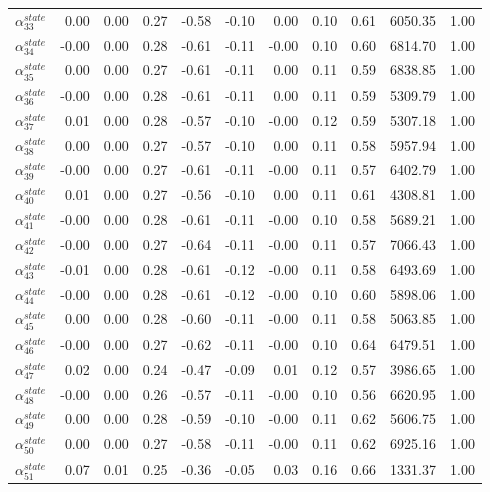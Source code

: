 \documentclass[12pt,english,a4paper]{article}
\begin{document}
\begin{table}[ht]
\begin{tabular}{rrrrrrrrrrr}
  $\alpha_{33}^{state}$ & 0.00 & 0.00 & 0.27 & -0.58 & -0.10 & 0.00 & 0.10 & 0.61 & 6050.35 & 1.00 \\ 
  $\alpha_{34}^{state}$ & -0.00 & 0.00 & 0.28 & -0.61 & -0.11 & -0.00 & 0.10 & 0.60 & 6814.70 & 1.00 \\ 
  $\alpha_{35}^{state}$ & 0.00 & 0.00 & 0.27 & -0.61 & -0.11 & 0.00 & 0.11 & 0.59 & 6838.85 & 1.00 \\ 
  $\alpha_{36}^{state}$ & -0.00 & 0.00 & 0.28 & -0.61 & -0.11 & 0.00 & 0.11 & 0.59 & 5309.79 & 1.00 \\ 
  $\alpha_{37}^{state}$ & 0.01 & 0.00 & 0.28 & -0.57 & -0.10 & -0.00 & 0.12 & 0.59 & 5307.18 & 1.00 \\ 
  $\alpha_{38}^{state}$ & 0.00 & 0.00 & 0.27 & -0.57 & -0.10 & 0.00 & 0.11 & 0.58 & 5957.94 & 1.00 \\ 
  $\alpha_{39}^{state}$ & -0.00 & 0.00 & 0.27 & -0.61 & -0.11 & -0.00 & 0.11 & 0.57 & 6402.79 & 1.00 \\ 
  $\alpha_{40}^{state}$ & 0.01 & 0.00 & 0.27 & -0.56 & -0.10 & 0.00 & 0.11 & 0.61 & 4308.81 & 1.00 \\ 
  $\alpha_{41}^{state}$ & -0.00 & 0.00 & 0.28 & -0.61 & -0.11 & -0.00 & 0.10 & 0.58 & 5689.21 & 1.00 \\ 
  $\alpha_{42}^{state}$ & -0.00 & 0.00 & 0.27 & -0.64 & -0.11 & -0.00 & 0.11 & 0.57 & 7066.43 & 1.00 \\ 
  $\alpha_{43}^{state}$ & -0.01 & 0.00 & 0.28 & -0.61 & -0.12 & -0.00 & 0.11 & 0.58 & 6493.69 & 1.00 \\ 
  $\alpha_{44}^{state}$ & -0.00 & 0.00 & 0.28 & -0.61 & -0.12 & -0.00 & 0.10 & 0.60 & 5898.06 & 1.00 \\ 
  $\alpha_{45}^{state}$ & 0.00 & 0.00 & 0.28 & -0.60 & -0.11 & -0.00 & 0.11 & 0.58 & 5063.85 & 1.00 \\ 
  $\alpha_{46}^{state}$ & -0.00 & 0.00 & 0.27 & -0.62 & -0.11 & -0.00 & 0.10 & 0.64 & 6479.51 & 1.00 \\ 
  $\alpha_{47}^{state}$ & 0.02 & 0.00 & 0.24 & -0.47 & -0.09 & 0.01 & 0.12 & 0.57 & 3986.65 & 1.00 \\ 
  $\alpha_{48}^{state}$ & -0.00 & 0.00 & 0.26 & -0.57 & -0.11 & -0.00 & 0.10 & 0.56 & 6620.95 & 1.00 \\ 
  $\alpha_{49}^{state}$ & 0.00 & 0.00 & 0.28 & -0.59 & -0.10 & -0.00 & 0.11 & 0.62 & 5606.75 & 1.00 \\ 
  $\alpha_{50}^{state}$ & 0.00 & 0.00 & 0.27 & -0.58 & -0.11 & -0.00 & 0.11 & 0.62 & 6925.16 & 1.00 \\ 
  $\alpha_{51}^{state}$ & 0.07 & 0.01 & 0.25 & -0.36 & -0.05 & 0.03 & 0.16 & 0.66 & 1331.37 & 1.00 \\ 

\end{tabular}
\end{table}
\end{document}
